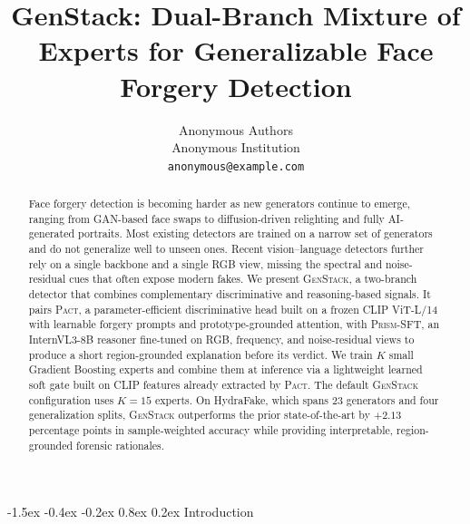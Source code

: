 \documentclass[10pt,twocolumn,letterpaper]{article}
\makeatletter
\renewcommand\section{\@startsection{section}{1}{\z@}%
  {-1.5ex \@plus -0.4ex \@minus -0.2ex}%
  {0.8ex \@plus 0.2ex}%
  {\normalfont\large\bfseries}}
\newcommand{\vfive}{\textsc{Pact}}
\makeatother
\begin{document}
\title{GenStack: Dual-Branch Mixture of Experts for Generalizable Face Forgery Detection}

\author{Anonymous Authors\\
Anonymous Institution\\
{\tt\small anonymous@example.com}
}

\maketitle
\thispagestyle{empty}

\begin{abstract}
Face forgery detection is becoming harder as new generators continue to emerge, ranging from GAN-based face swaps to diffusion-driven relighting and fully AI-generated portraits. Most existing detectors are trained on a narrow set of generators and do not generalize well to unseen ones. Recent vision--language detectors further rely on a single backbone and a single RGB view, missing the spectral and noise-residual cues that often expose modern fakes. We present \textsc{GenStack}, a two-branch detector that combines complementary discriminative and reasoning-based signals. It pairs \textsc{Pact}, a parameter-efficient discriminative head built on a frozen CLIP ViT-L/14 with learnable forgery prompts and prototype-grounded attention, with \textsc{Prism-SFT}, an InternVL3-8B reasoner fine-tuned on RGB, frequency, and noise-residual views to produce a short region-grounded explanation before its verdict. We train $K$ small Gradient Boosting experts and combine them at inference via a lightweight learned soft gate built on CLIP features already extracted by \vfive{}. The default \textsc{GenStack} configuration uses $K{=}15$ experts. On HydraFake, which spans $23$ generators and four generalization splits, \textsc{GenStack} outperforms the prior state-of-the-art by $+2.13$ percentage points in sample-weighted accuracy while providing interpretable, region-grounded forensic rationales.
\end{abstract}

\section{Introduction}
\label{sec:intro}
\end{document}

